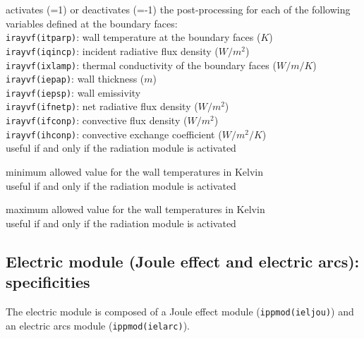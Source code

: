 {activates (=1) or deactivates (=-1) the post-processing for each of the
following variables defined at the boundary faces:\\
\hspace*{1.3cm} {\tt irayvf(itparp)}: wall temperature at the boundary
faces ($K$)\\
\hspace*{1.3cm} {\tt irayvf(iqincp)}: incident radiative flux density
($W/m^2$)\\
\hspace*{1.3cm} {\tt irayvf(ixlamp)}: thermal conductivity of the
boundary faces ($W/m/K$)\\
\hspace*{1.3cm} {\tt irayvf(iepap)}: wall thickness ($m$)\\
\hspace*{1.3cm} {\tt irayvf(iepsp)}: wall emissivity \\
\hspace*{1.3cm} {\tt irayvf(ifnetp)}: net radiative flux density ($W/m^2$)\\
\hspace*{1.3cm} {\tt irayvf(ifconp)}: convective flux density ($W/m^2$)\\
\hspace*{1.3cm} {\tt irayvf(ihconp)}: convective exchange coefficient
($W/m^2/K$)\\
useful if and only if the radiation module is activated}

{minimum allowed value for the wall temperatures in Kelvin\\
useful if and only if the radiation module is activated}

{maximum allowed value for the wall temperatures in Kelvin\\
useful if and only if the radiation module is activated}

\subsection{Electric module (Joule effect and electric arcs): specificities}

The electric module is composed of a Joule effect module
(\texttt{ippmod(ieljou)}) and an electric arcs module
(\texttt{ippmod(ielarc)}).

